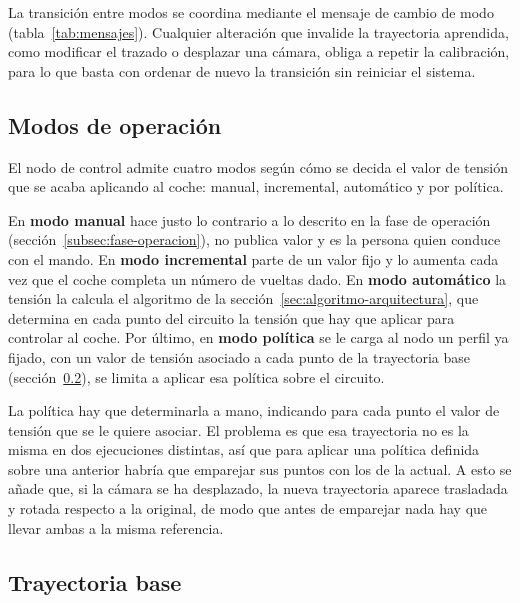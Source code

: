 La transición entre modos se coordina mediante el mensaje de cambio de modo (tabla~\ref{tab:mensajes}). Cualquier alteración que invalide la trayectoria aprendida, como modificar el trazado o desplazar una cámara, obliga a repetir la calibración, para lo que basta con ordenar de nuevo la transición sin reiniciar el sistema.

\subsection{Modos de operación}
\label{subsec:modos-operacion}

El nodo de control admite cuatro modos según cómo se decida el valor de tensión que se acaba aplicando al coche: manual, incremental, automático y por política.

En \textbf{modo manual} hace justo lo contrario a lo descrito en la fase de operación (sección~\ref{subsec:fase-operacion}), no publica valor y es la persona quien conduce con el mando. En \textbf{modo incremental} parte de un valor fijo y lo aumenta cada vez que el coche completa un número de vueltas dado. En \textbf{modo automático} la tensión la calcula el algoritmo de la sección~\ref{sec:algoritmo-arquitectura}, que determina en cada punto del circuito la tensión que hay que aplicar para controlar al coche. Por último, en \textbf{modo política} se le carga al nodo un perfil ya fijado, con un valor de tensión asociado a cada punto de la trayectoria base (sección~\ref{sec:trayectoria-base}), se limita a aplicar esa política sobre el circuito.

La política hay que determinarla a mano, indicando para cada punto el valor de tensión que se le quiere asociar. El problema es que esa trayectoria no es la misma en dos ejecuciones distintas, así que para aplicar una política definida sobre una anterior habría que emparejar sus puntos con los de la actual. A esto se añade que, si la cámara se ha desplazado, la nueva trayectoria aparece trasladada y rotada respecto a la original, de modo que antes de emparejar nada hay que llevar ambas a la misma referencia.

\subsection{Trayectoria base}
\label{sec:trayectoria-base}

